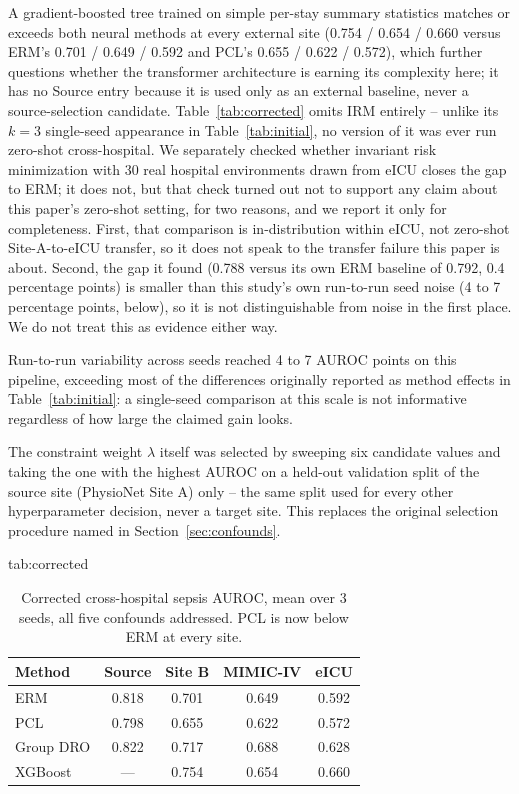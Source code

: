 \documentclass[pmlr,twocolumn,10pt]{jmlr} %
\begin{document}
A gradient-boosted tree \citep{chen2016xgboost} trained on simple per-stay
summary statistics matches or exceeds both neural methods at every external
site (0.754 / 0.654 / 0.660 versus ERM's 0.701 / 0.649 / 0.592 and PCL's
0.655 / 0.622 / 0.572), which further questions whether the transformer
architecture is earning its complexity here; it has no Source entry because
it is used only as an external baseline, never a source-selection
candidate. Table~\ref{tab:corrected} omits IRM entirely -- unlike its
$k{=}3$ single-seed appearance in Table~\ref{tab:initial}, no version of it
was ever run zero-shot cross-hospital. We separately checked whether
invariant risk minimization \citep{arjovsky2019invariant} with 30 real
hospital environments drawn from eICU closes the gap to ERM; it does not,
but that check turned out not to support any claim about this paper's zero-shot
setting, for two reasons, and we report it only for completeness. First,
that comparison is in-distribution within eICU, not zero-shot
Site-A-to-eICU transfer, so it does not speak to the transfer failure this
paper is about. Second, the gap it found (0.788 versus its own ERM baseline
of 0.792, 0.4 percentage points) is smaller than this study's own
run-to-run seed noise (4 to 7 percentage points, below), so it is not
distinguishable from noise in the first place. We do not treat this as
evidence either way.

Run-to-run variability across seeds reached 4 to 7 AUROC points on this
pipeline, exceeding most of the differences originally reported as method
effects in Table~\ref{tab:initial}: a single-seed comparison at this scale
is not informative regardless of how large the claimed gain looks.

The constraint weight $\lambda$ itself was selected by sweeping six
candidate values and taking the one with the highest AUROC on a held-out
validation split of the source site (PhysioNet Site A) only -- the same
split used for every other hyperparameter decision, never a target site.
This replaces the original selection procedure named in
Section~\ref{sec:confounds}.

\begin{table}[htbp]
\floatconts
  {tab:corrected}%
  {\caption{Corrected cross-hospital sepsis AUROC, mean over 3 seeds, all
   five confounds addressed. PCL is now below ERM at every site.}}%
  {\begin{tabular}{lcccc}
  \toprule
  Method & Source & Site B & MIMIC-IV & eICU \\
  \midrule
  ERM & 0.818 & 0.701 & 0.649 & 0.592 \\
  PCL & 0.798 & 0.655 & 0.622 & 0.572 \\
  Group DRO & 0.822 & 0.717 & 0.688 & 0.628 \\
  XGBoost & --- & 0.754 & 0.654 & 0.660 \\
  \bottomrule
  \end{tabular}}
\end{table}
\end{document}
